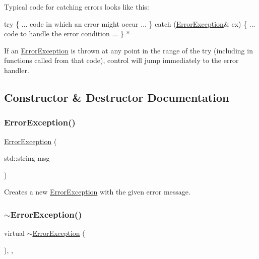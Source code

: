 Typical code for catching errors looks like this\+:


\begin{DoxyPre}
     try \{
        ... code in which an error might occur ...
     \} catch (\mbox{\hyperlink{classErrorException}{ErrorException}}\& ex) \{
        ... code to handle the error condition ...
     \}
*\end{DoxyPre}


If an {\ttfamily \mbox{\hyperlink{classErrorException}{Error\+Exception}}} is thrown at any point in the range of the {\ttfamily try} (including in functions called from that code), control will jump immediately to the error handler. 

\subsection{Constructor \& Destructor Documentation}
\mbox{\label{classErrorException_a4f422b01fff7cc16eea81e00638f44d2}} 
\subsubsection{\texorpdfstring{Error\+Exception()}{ErrorException()}}
{\footnotesize\ttfamily \mbox{\hyperlink{classErrorException}{Error\+Exception}} (\begin{DoxyParamCaption}\item[{std\+::string}]{msg }\end{DoxyParamCaption})}



Creates a new \mbox{\hyperlink{classErrorException}{Error\+Exception}} with the given error message. 

\mbox{\label{classErrorException_a61c8f6114a93ea2ff11a5f08e3640d76}} 
\subsubsection{\texorpdfstring{$\sim$\+Error\+Exception()}{~ErrorException()}}
{\footnotesize\ttfamily virtual $\sim$\mbox{\hyperlink{classErrorException}{Error\+Exception}} (\begin{DoxyParamCaption}{ }\end{DoxyParamCaption})\hspace{0.3cm}{\ttfamily [virtual]}, {\ttfamily [default]}, {\ttfamily [noexcept]}}



